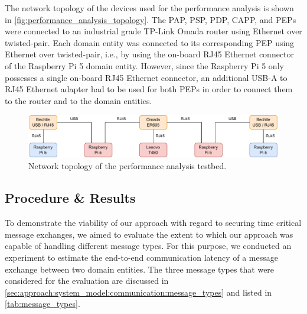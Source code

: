 The network topology of the devices used for the performance analysis is shown in \autoref{fig:performance_analysis_topology}.
The PAP, PSP, PDP, CAPP, and PEPs were connected to an industrial grade TP-Link Omada router using Ethernet over twisted-pair.
Each domain entity was connected to its corresponding PEP using Ethernet over twisted-pair, i.e., by using the on-board RJ45 Ethernet connector of the Raspberry Pi 5 domain entity.
However, since the Raspberry Pi 5 only possesses a single on-board RJ45 Ethernet connector, an additional USB-A to RJ45 Ethernet adapter had to be used for both PEPs in order to connect them to the router and to the domain entities.
\begin{figure}
    \centering
    \includegraphics[width=1.0\linewidth]{figures/performance_evaluation_topology.drawio.pdf}
    \caption{Network topology of the performance analysis testbed.}
    \label{fig:performance_analysis_topology}
\end{figure}

\subsection{Procedure \& Results}
\label{sec:evaluation:performance:procedure}
To demonstrate the viability of our approach with regard to securing time critical message exchanges, we aimed to evaluate the extent to which our approach was capable of handling different message types.
For this purpose, we conducted an experiment to estimate the end-to-end communication latency of a message exchange between two domain entities.
The three message types that were considered for the evaluation are discussed in \autoref{sec:approach:system_model:communication:message_types} and listed in \autoref{tab:message_types}.


